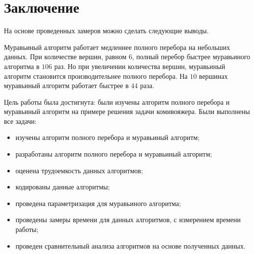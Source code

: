\chapter*{Заключение}

На основе проведенных замеров можно сделать следующие выводы.

Муравьиный алгоритм работает медленнее полного перебора на небольших данных. При количестве вершин, равном $6$, полный перебор быстрее муравьиного алгоритма в $106$ раз. Но при увеличении количества вершин, муравьиный алгоритм становится производительнее полного перебора. На $10$ вершинах муравьиный алгоритм работает быстрее в $44$ раза.

Цель работы была достигнута: были изучены алгоритм полного перебора и муравьиный алгоритм на примере решения задачи комивояжера. Были выполнены все задачи:

\begin{itemize}
	\item изучены алгоритм полного перебора и муравьиный алгоритм;
	\item разработаны алгоритм полного перебора и муравьиный алгоритм;
	\item оценена трудоемкость данных алгоритмов;
	\item кодированы данные алгоритмы;
	\item проведена параметризация для муравьиного алгоритма;
	\item проведены замеры времени для данных алгоритмов, с измерением времени работы; 
	\item проведен сравнительный анализа алгоритмов на основе полученных данных.
\end{itemize}


\newpage